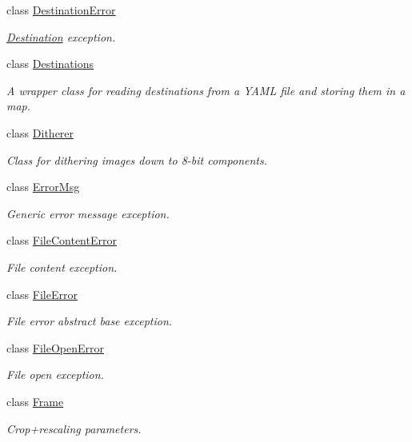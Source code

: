 \begin{DoxyCompactItemize}
class \hyperlink{class_photo_finish_1_1_destination_error}{Destination\+Error}
\begin{DoxyCompactList}\small\item\em \hyperlink{class_photo_finish_1_1_destination}{Destination} exception. \end{DoxyCompactList}\item 
class \hyperlink{class_photo_finish_1_1_destinations}{Destinations}
\begin{DoxyCompactList}\small\item\em A wrapper class for reading destinations from a Y\+A\+ML file and storing them in a map. \end{DoxyCompactList}\item 
class \hyperlink{class_photo_finish_1_1_ditherer}{Ditherer}
\begin{DoxyCompactList}\small\item\em Class for dithering images down to 8-\/bit components. \end{DoxyCompactList}\item 
class \hyperlink{class_photo_finish_1_1_error_msg}{Error\+Msg}
\begin{DoxyCompactList}\small\item\em Generic error message exception. \end{DoxyCompactList}\item 
class \hyperlink{class_photo_finish_1_1_file_content_error}{File\+Content\+Error}
\begin{DoxyCompactList}\small\item\em File content exception. \end{DoxyCompactList}\item 
class \hyperlink{class_photo_finish_1_1_file_error}{File\+Error}
\begin{DoxyCompactList}\small\item\em File error abstract base exception. \end{DoxyCompactList}\item 
class \hyperlink{class_photo_finish_1_1_file_open_error}{File\+Open\+Error}
\begin{DoxyCompactList}\small\item\em File open exception. \end{DoxyCompactList}\item 
class \hyperlink{class_photo_finish_1_1_frame}{Frame}
\begin{DoxyCompactList}\small\item\em Crop+rescaling parameters. \end{DoxyCompactList}\item 

\end{DoxyCompactItemize}
